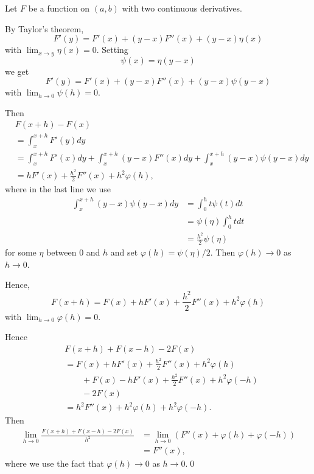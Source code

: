 \documentclass[oneside]{article}
\begin{document}
Let $F$ be a function on $(a, b)$ with two continuous derivatives.

By Taylor's theorem, \[
  F'(y) = F'(x) + (y-x)F''(x) + (y-x)\eta(x)
\] with $\lim_{x\to y}\eta(x) = 0$. Setting \[
  \psi(x) = \eta(y-x)
\] we get \[
  F'(y) = F'(x) + (y-x)F''(x) + (y-x)\psi(y-x)
\] with $\lim_{h\to0}\psi(h) = 0$.

Then \begin{align*}
  &F(x+h) - F(x) \\
  &= \int_x^{x+h}F'(y)dy \\
  &= \int_x^{x+h}F'(x)dy + \int_x^{x+h}(y-x)F''(x)dy + \int_x^{x+h}(y-x)\psi(y-x)dy \\
  &= hF'(x) + \frac{h^2}{2}F''(x) + h^2\varphi(h) \text{,}
\end{align*}
where in the last line we use\begin{align*}
  \int_x^{x+h}(y-x)\psi(y-x)dy
  &= \int_0^ht\psi(t)dt \\
  &= \psi(\eta)\int_0^htdt \\
  &= \frac{h^2}{2}\psi(\eta)
\end{align*} for some $\eta$ between $0$ and $h$ and set
$\varphi(h) = \psi(\eta) / 2$. Then $\varphi(h) \to 0$ as $h \to 0$.

Hence,\[
  F(x+h) = F(x) + hF'(x) + \frac{h^2}{2}F''(x) + h^2\varphi(h)
\] with $\lim_{h\to0}\varphi(h) = 0$.

Hence\begin{align*}
  &F(x+h) + F(x-h) - 2F(x) \\
  &= F(x) + hF'(x) + \frac{h^2}{2}F''(x) + h^2\varphi(h) \\
  &\qquad+ F(x) - hF'(x) + \frac{h^2}{2}F''(x) + h^2\varphi(-h) \\
  &\qquad- 2F(x) \\
  &= h^2F''(x) + h^2\varphi(h) + h^2\varphi(-h) \text{.}
\end{align*} Then \begin{align*}
  \lim_{h\to0}\frac{F(x+h) + F(x-h) - 2F(x)}{h^2}
  &= \lim_{h\to0}\left(F''(x) + \varphi(h) + \varphi(-h)\right) \\
  &= F''(x)\text{,}
\end{align*} where we use the fact that $\varphi(h) \to 0$ as $h \to 0$.\qed
\end{document}
